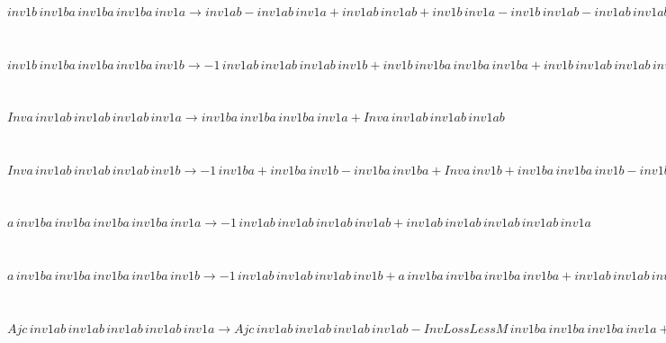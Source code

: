 \documentclass[rep10,leqno]{report}
\begin{document}
\begin{minipage}{6in}
$
inv1b\,
 inv1ba\,
 inv1ba\,
 inv1ba\,
 inv1a\rightarrow inv1ab - inv1ab\,
 inv1a + inv1ab\,
 inv1ab + inv1b\,
 inv1a - inv1b\,
 inv1ab - inv1ab\,
 inv1ab\,
 inv1a + inv1ab\,
 inv1ab\,
 inv1ab + inv1b\,
 inv1ab\,
 inv1a - inv1b\,
 inv1ab\,
 inv1ab - inv1ab\,
 inv1ab\,
 inv1ab\,
 inv1a + inv1b\,
 inv1ab\,
 inv1ab\,
 inv1a - inv1b\,
 inv1ab\,
 inv1ab\,
 inv1ab + inv1b\,
 inv1ab\,
 inv1ab\,
 inv1ab\,
 inv1a
$
\end{minipage}\medskip \\
\begin{minipage}{6in}
$
inv1b\,
 inv1ba\,
 inv1ba\,
 inv1ba\,
 inv1b\rightarrow -1\,
 inv1ab\,
 inv1ab\,
 inv1ab\,
 inv1b + inv1b\,
 inv1ba\,
 inv1ba\,
 inv1ba + inv1b\,
 inv1ab\,
 inv1ab\,
 inv1ab\,
 inv1b
$
\end{minipage}\medskip \\
\begin{minipage}{6in}
$
Inva\,
 inv1ab\,
 inv1ab\,
 inv1ab\,
 inv1a\rightarrow inv1ba\,
 inv1ba\,
 inv1ba\,
 inv1a + Inva\,
 inv1ab\,
 inv1ab\,
 inv1ab
$
\end{minipage}\medskip \\
\begin{minipage}{6in}
$
Inva\,
 inv1ab\,
 inv1ab\,
 inv1ab\,
 inv1b\rightarrow -1\,
 inv1ba + inv1ba\,
 inv1b - inv1ba\,
 inv1ba + Inva\,
 inv1b + inv1ba\,
 inv1ba\,
 inv1b - inv1ba\,
 inv1ba\,
 inv1ba + inv1ba\,
 inv1ba\,
 inv1ba\,
 inv1b
$
\end{minipage}\medskip \\
\begin{minipage}{6in}
$
a\,
 inv1ba\,
 inv1ba\,
 inv1ba\,
 inv1ba\,
 inv1a\rightarrow -1\,
 inv1ab\,
 inv1ab\,
 inv1ab\,
 inv1ab + inv1ab\,
 inv1ab\,
 inv1ab\,
 inv1ab\,
 inv1a
$
\end{minipage}\medskip \\
\begin{minipage}{6in}
$
a\,
 inv1ba\,
 inv1ba\,
 inv1ba\,
 inv1ba\,
 inv1b\rightarrow -1\,
 inv1ab\,
 inv1ab\,
 inv1ab\,
 inv1b + a\,
 inv1ba\,
 inv1ba\,
 inv1ba\,
 inv1ba + inv1ab\,
 inv1ab\,
 inv1ab\,
 inv1ab\,
 inv1b
$
\end{minipage}\medskip \\
\begin{minipage}{6in}
$
Ajc\,
 inv1ab\,
 inv1ab\,
 inv1ab\,
 inv1ab\,
 inv1a\rightarrow Ajc\,
 inv1ab\,
 inv1ab\,
 inv1ab\,
 inv1ab - InvLossLessM\,
 inv1ba\,
 inv1ba\,
 inv1ba\,
 inv1a + InvLossLessM\,
 inv1ba\,
 inv1ba\,
 inv1ba\,
 inv1ba\,
 inv1a
$
\end{minipage}\medskip \\
\end{document}
